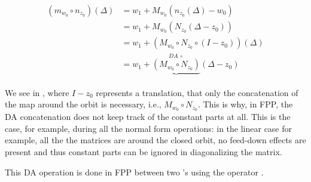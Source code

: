 \documentclass{hitec}     %
\begin{document}
{{{{%
\begin{align} \left({{m}_{{w}_{0}}\circ {n}_{{z}_{0}}}\right)\left({\Delta }\right)&={w}_{1}+{M}_{{w}_{0}}({n}_{{z}_{0}}\left({\Delta }\right)-{w}_{0})\nonumber \\
 &={w}_{1}+{M}_{{w}_{0}}({N}_{{z}_{0}}(\Delta -{z}_{0}))\nonumber \\
 &={w}_{1}+\left({{M}_{{w}_{0}}\circ {N}_{{z}_{0}}\circ (I-{z}_{0})}\right)\left({\Delta }\right) \nonumber \\
 &={w}_{1}+\underbrace{\left({{M}_{{w}_{0}}\circ {N}_{{z}_{0}}}\right)}\limits_{}^{DA\ \circ }\left({\Delta -{z}_{0}}\right)\label{eq:concatda}\end{align}


We see in ,  where $I-{z}_{0}$ represents a translation,  that only the concatenation of the map around the orbit is necessary, i.e., %
%
${M}_{{w}_{0}}\circ {N}_{{z}_{0}}$. This is why, in FPP, the DA concatenation does not keep track of the constant parts at all. This is the case, for example, during all the normal form operations:   in the linear case for example, all the  the matrices are  around the closed orbit, no feed-down effects are present and thus constant parts can be ignored in diagonalizing the matrix.


This DA operation is done in FPP between two 's using the operator \vn{*}.

}}}}
\end{document}
